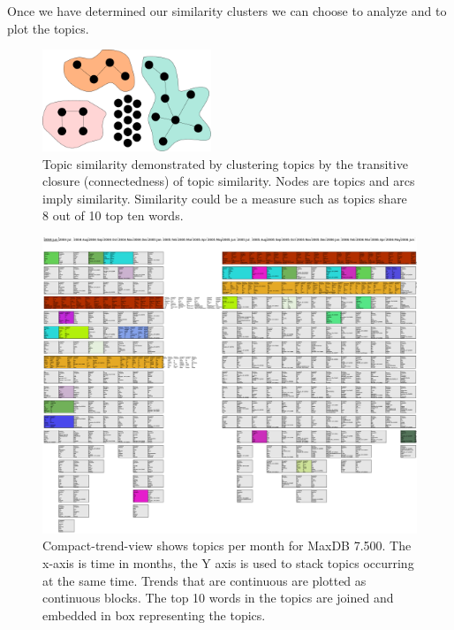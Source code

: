 \documentclass[times, 10pt,twocolumn]{article}
\begin{document}
Once we have determined our similarity clusters we can choose to
analyze and to plot the topics.

\begin{figure}[t]
  \centering
  \includegraphics[width=0.45\textwidth]{transitiveclosure}
  \caption{Topic similarity demonstrated by clustering topics by the transitive closure (connectedness)
    of topic similarity. Nodes are topics and
    arcs imply similarity. Similarity could be a measure such as
    topics share 8 out of 10 top ten words.}
\label{fig:closure}
\end{figure}


\begin{figure}
  \centering
  \includegraphics[width=1.0\textwidth]{time-smear-plot}%
  \caption{Compact-trend-view shows topics per month for MaxDB
    7.500. The x-axis is time in months, the Y axis is used to stack
    topics occurring at the same time. Trends that are continuous are
    plotted as continuous blocks. The top 10 words in the topics are
    joined and embedded in box representing the topics.}
  \label{fig:topicsmear}
\end{figure}
\end{document}
